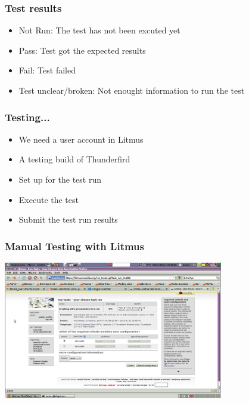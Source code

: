 \documentclass{beamer}
\begin{document}

\begin{frame}
\frametitle{Test results}
 \begin{itemize}
   \item Not Run: The test has not been excuted yet
   \item Pass: Test got the expected results
   \item Fail: Test failed
   \item Test unclear/broken: Not enought information to run the test
 \end{itemize}
\end{frame}


\begin{frame}
\frametitle{Testing...}
 \begin{itemize}
   \item We need a user account in Litmus
   \item A testing build of Thunderfird
   \item Set up for the test run
   \item Execute the test
   \item Submit the test run results
 \end{itemize}
\end{frame}

\begin{frame}
\frametitle{Manual Testing with Litmus}
\begin{center}
 \includegraphics[height=6cm]{figs/Litmus_01_Config_Required_Criteria.png}
\begin{figure}
\end{figure}
\end{center}
\end{frame}
\end{document}

